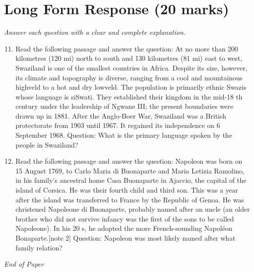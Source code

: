 \documentclass[12pt]{article}
\begin{document}
\section*{Long Form Response (20 marks)}
\textit{Answer each question with a clear and complete explanation.}
\begin{enumerate}[label=\arabic*.]
\setcounter{enumi}{10}
\item Read the following passage and answer the question: At no more than 200 kilometres (120 mi) north to south and 130 kilometres (81 mi) east to west, Swaziland is one of the smallest countries in Africa. Despite its size, however, its climate and topography is diverse, ranging from a cool and mountainous highveld to a hot and dry lowveld. The population is primarily ethnic Swazis whose language is siSwati. They established their kingdom in the mid-18 th century under the leadership of Ngwane III; the present boundaries were drawn up in 1881. After the Anglo-Boer War, Swaziland was a British protectorate from 1903 until 1967. It regained its independence on 6 September 1968. Question: What is the primary language spoken by the people in Swaziland?
\item Read the following passage and answer the question: Napoleon was born on 15 August 1769, to Carlo Maria di Buonaparte and Maria Letizia Ramolino, in his family's ancestral home Casa Buonaparte in Ajaccio, the capital of the island of Corsica. He was their fourth child and third son. This was a year after the island was transferred to France by the Republic of Genoa. He was christened Napoleone di Buonaparte, probably named after an uncle (an older brother who did not survive infancy was the first of the sons to be called Napoleone). In his 20 s, he adopted the more French-sounding Napoléon Bonaparte.[note 2] Question: Napoleon was most likely named after what family relation?
\end{enumerate}

\vfill
\noindent\textit{End of Paper}
\end{document}

